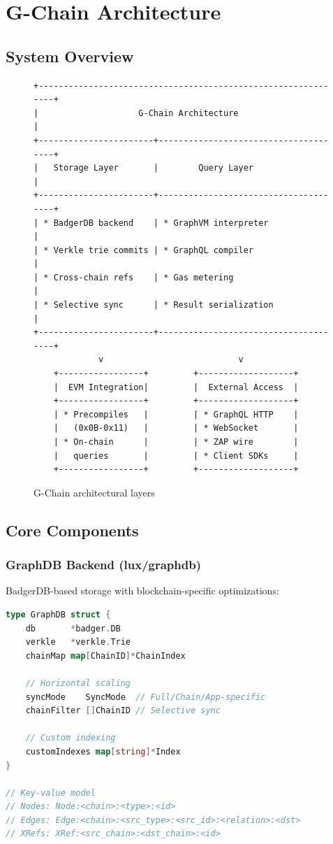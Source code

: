 \section{G-Chain Architecture}


\subsection{System Overview}

\begin{figure}[h]
\centering
\begin{verbatim}
+--------------------------------------------------------------+
|                    G-Chain Architecture                       |
+-----------------------+--------------------------------------+
|   Storage Layer       |        Query Layer                   |
+-----------------------+--------------------------------------+
| * BadgerDB backend    | * GraphVM interpreter                |
| * Verkle trie commits | * GraphQL compiler                   |
| * Cross-chain refs    | * Gas metering                       |
| * Selective sync      | * Result serialization               |
+-----------------------+--------------------------------------+
             v                           v
    +-----------------+         +-------------------+
    |  EVM Integration|         |  External Access  |
    +-----------------+         +-------------------+
    | * Precompiles   |         | * GraphQL HTTP    |
    |   (0x0B-0x11)   |         | * WebSocket       |
    | * On-chain      |         | * ZAP wire        |
    |   queries       |         | * Client SDKs     |
    +-----------------+         +-------------------+
\end{verbatim}
\caption{G-Chain architectural layers}
\end{figure}

\subsection{Core Components}

\subsubsection{GraphDB Backend (lux/graphdb)}

BadgerDB-based storage with blockchain-specific optimizations:

\begin{lstlisting}[language=Go, basicstyle=\small\ttfamily]
type GraphDB struct {
    db       *badger.DB
    verkle   *verkle.Trie
    chainMap map[ChainID]*ChainIndex
    
    // Horizontal scaling
    syncMode    SyncMode  // Full/Chain/App-specific
    chainFilter []ChainID // Selective sync
    
    // Custom indexing
    customIndexes map[string]*Index
}

// Key-value model
// Nodes: Node:<chain>:<type>:<id>
// Edges: Edge:<chain>:<src_type>:<src_id>:<relation>:<dst>
// XRefs: XRef:<src_chain>:<dst_chain>:<id>
\end{lstlisting}

